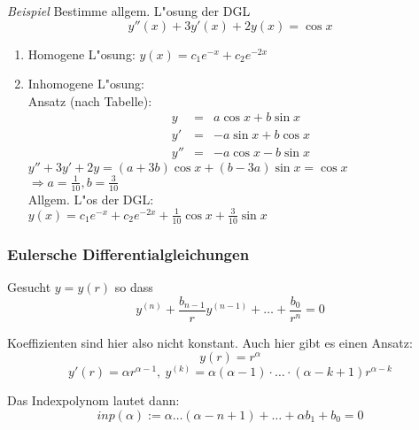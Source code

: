 \documentclass[10pt, a4paper, twocolumn]{scrartcl}
\begin{document}
\textit{Beispiel} Bestimme allgem. L"osung der DGL
$$y''(x)+3y'(x)+2y(x)=\cos x$$

\begin{enumerate}
 \item Homogene L"osung: $y(x)=c_1 e^{-x}+c_2 e^{-2x}$
 \item Inhomogene L"osung:\\
  Ansatz (nach Tabelle):
  \begin{eqnarray}
   y &	=& a\cos x+ b\sin x\nonumber \\
   y'&	=& -a\sin x + b\cos x \nonumber \\
   y''&	=& -a\cos x - b\sin x \nonumber 
  \end{eqnarray}
  $y''+3y'+2y=(a+3b)\cos x + (b-3a)\sin x = \cos x$\\
  $\Rightarrow a=\frac{1}{10}, b=\frac{3}{10}$\\
  Allgem. L"os der DGL:\\
  $y(x)=c_1e^{-x}+c_2e^{-2x}+\frac{1}{10}\cos x+\frac{3}{10}\sin x$
\end{enumerate}


\subsubsection{Eulersche Differentialgleichungen}

Gesucht $y=y(r)$ so dass
\begin{equation}
 \label{euler_diffgl}
 y^{(n)}+\frac{b_{n-1}}{r}y^{(n-1)}+\ldots+\frac{b_0}{r^n}=0
\end{equation}

Koeffizienten sind hier also nicht konstant. Auch hier gibt es einen Ansatz:
$$y(r)=r^\alpha$$
$$y'(r)=\alpha r^{\alpha-1},\:y^{(k)}=\alpha(\alpha -1)\cdotp\ldots\cdotp(\alpha -k+1)r^{\alpha - k}$$

Das Indexpolynom lautet dann:
$$inp(\alpha):=\alpha\ldots(\alpha-n+1)+\ldots+\alpha b_1+b_0=0$$
\end{document}
